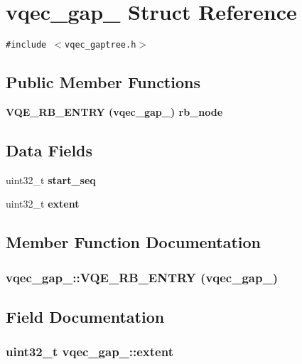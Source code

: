 \section{vqec\_\-gap\_\- Struct Reference}
\label{structvqec__gap__}
{\tt \#include $<$vqec\_\-gaptree.h$>$}

\subsection*{Public Member Functions}
\begin{CompactItemize}
\item 
\bf{VQE\_\-RB\_\-ENTRY} (\bf{vqec\_\-gap\_\-}) rb\_\-node
\end{CompactItemize}
\subsection*{Data Fields}
\begin{CompactItemize}
\item 
uint32\_\-t \bf{start\_\-seq}
\item 
uint32\_\-t \bf{extent}
\end{CompactItemize}


\subsection{Member Function Documentation}
\subsubsection{\setlength{\rightskip}{0pt plus 5cm}vqec\_\-gap\_\-::VQE\_\-RB\_\-ENTRY (\bf{vqec\_\-gap\_\-})}\label{structvqec__gap___f313305b5b0d7e38ae948125baba5981}




\subsection{Field Documentation}
\subsubsection{\setlength{\rightskip}{0pt plus 5cm}uint32\_\-t \bf{vqec\_\-gap\_\-::extent}}\label{structvqec__gap___c1038331f98c30a1ff2ca04e9feb576e}


